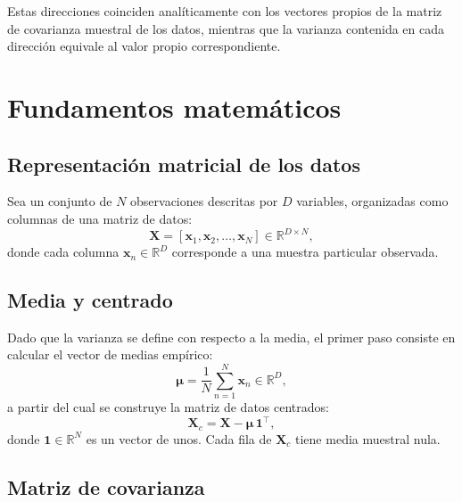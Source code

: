 \documentclass[11pt,letterpaper]{article}
\begin{document}
	Estas direcciones coinciden analíticamente con los vectores propios de la matriz de covarianza muestral de los datos, mientras que la varianza contenida en cada dirección equivale al valor propio correspondiente.
	
	\newpage
	
	\section{Fundamentos matemáticos}
	
	\subsection{Representación matricial de los datos}
	
	Sea un conjunto de $N$ observaciones descritas por $D$ variables, organizadas como columnas de una matriz de datos:
	\begin{equation}
		\mathbf{X} = [\mathbf{x}_1, \mathbf{x}_2, \dots, \mathbf{x}_N] \in \mathbb{R}^{D \times N},
		\label{eq:datos}
	\end{equation}
	donde cada columna $\mathbf{x}_n \in \mathbb{R}^D$ corresponde a una muestra particular observada.
	
	\subsection{Media y centrado}
	
	Dado que la varianza se define con respecto a la media, el primer paso consiste en calcular el vector de medias empírico:
	\begin{equation}
		\boldsymbol{\mu} = \frac{1}{N} \sum_{n=1}^{N} \mathbf{x}_n \in \mathbb{R}^{D},
		\label{eq:media}
	\end{equation}
	a partir del cual se construye la matriz de datos centrados:
	\begin{equation}
		\mathbf{X}_c = \mathbf{X} - \boldsymbol{\mu}\,\mathbf{1}^{\top},
		\label{eq:centrado}
	\end{equation}
	donde $\mathbf{1} \in \mathbb{R}^N$ es un vector de unos. Cada fila de $\mathbf{X}_c$ tiene media muestral nula.
	
	\subsection{Matriz de covarianza}
	
\end{document}
